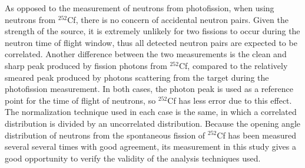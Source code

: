 As opposed to the measurement of neutrons from photofission, when using neutrons from $^{252}$Cf, there is no concern of accidental neutron pairs.
Given the strength of the source, it is extremely unlikely for two fissions to occur during the neutron time of flight window, thus all detected neutron pairs are expected to be correlated.
Another difference between the two measurements is the clean and sharp peak produced by fission photons from $^{252}$Cf, compared to the relatively smeared peak produced by photons scattering from the target during the photofission measurement.
In both cases, the photon peak is used as a reference point for the time of flight of neutrons, so $^{252}$Cf has less error due to this effect.
The normalization technique used in each case is the same, in which a correlated distribution is divided by an uncorrelated distribution.
Because the opening angle distribution of neutrons from the spontaneous fission of $^{252}$Cf has been measured several several times with good agreement, its measurement in this study gives a good opportunity to verify the validity of the analysis techniques used.
